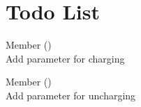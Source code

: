 \chapter{Todo List }
\hypertarget{todo}{}\label{todo}

\begin{DoxyRefList}
\item[Member \doxylink{class_t_p_s_1_1_battery_a4dde394ef55a81d223bc594a2d46d7c3}{TPS\+::Battery\+::Charge} ()]\hfill \\
\label{todo__todo000001}%
%
Add parameter for charging  
\item[Member \doxylink{class_t_p_s_1_1_battery_ac2b3768a3903191223715638dcedd431}{TPS\+::Battery\+::Un\+Charge} ()]\hfill \\
\label{todo__todo000002}%
%
Add parameter for uncharging 
\end{DoxyRefList}